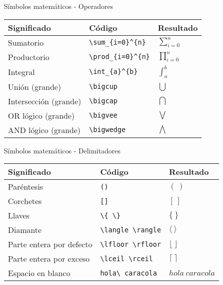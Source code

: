 \documentclass[ignorenonframetext,]{beamer}
\begin{document}
\begin{frame}[fragile]{Símbolos matemáticos - Operadores}
\protect\hypertarget{simbolos-matematicos---operadores}{}

\begin{longtable}[]{@{}lll@{}}
\toprule
Significado & Código & Resultado\tabularnewline
\midrule
\endhead
Sumatorio & \texttt{\textbackslash{}sum\_\{i=0\}\^{}\{n\}} &
\(\sum_{i=0}^{n}\)\tabularnewline
Productorio & \texttt{\textbackslash{}prod\_\{i=0\}\^{}\{n\}} &
\(\prod_{i=0}^{n}\)\tabularnewline
Integral & \texttt{\textbackslash{}int\_\{a\}\^{}\{b\}} &
\(\int_{a}^{b}\)\tabularnewline
Unión (grande) & \texttt{\textbackslash{}bigcup} &
\(\bigcup\)\tabularnewline
Intersección (grande) & \texttt{\textbackslash{}bigcap} &
\(\bigcap\)\tabularnewline
OR lógico (grande) & \texttt{\textbackslash{}bigvee} &
\(\bigvee\)\tabularnewline
AND lógico (grande) & \texttt{\textbackslash{}bigwedge} &
\(\bigwedge\)\tabularnewline
\bottomrule
\end{longtable}

\end{frame}

\begin{frame}[fragile]{Símbolos matemáticos - Delimitadores}
\protect\hypertarget{simbolos-matematicos---delimitadores}{}

\begin{longtable}[]{@{}lll@{}}
\toprule
Significado & Código & Resultado\tabularnewline
\midrule
\endhead
Paréntesis & \texttt{()} & \((\ )\)\tabularnewline
Corchetes & \texttt{{[}{]}} & \([\ ]\)\tabularnewline
Llaves & \texttt{\textbackslash{}\{\ \textbackslash{}\}} &
\(\{\ \}\)\tabularnewline
Diamante & \texttt{\textbackslash{}langle\ \textbackslash{}rangle} &
\(\langle\ \rangle\)\tabularnewline
Parte entera por defecto &
\texttt{\textbackslash{}lfloor\ \textbackslash{}rfloor} &
\(\lfloor\  \rfloor\)\tabularnewline
Parte entera por exceso &
\texttt{\textbackslash{}lceil\ \textbackslash{}rceil} &
\(\lceil\ \rceil\)\tabularnewline
Espacio en blanco & \texttt{hola\textbackslash{}\ caracola} &
\(hola\ caracola\)\tabularnewline
\bottomrule
\end{longtable}

\end{frame}
\end{document}
